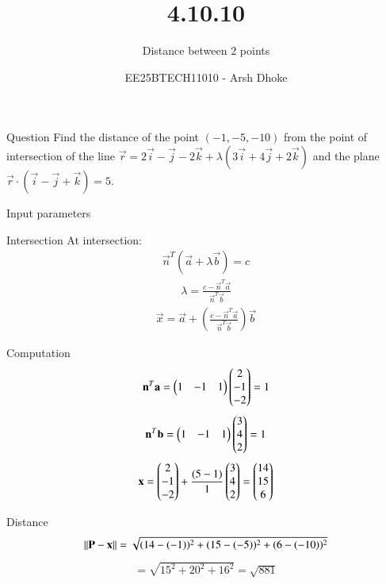 \documentclass{beamer}
\title{4.10.10}
\subtitle{Distance between 2 points}
\author{EE25BTECH11010 - Arsh Dhoke}
\date{}
\begin{document}
\begin{frame}
  \titlepage
\end{frame}

\begin{frame}{Question}
Find the distance of the point $(-1,-5,-10)$ from the point of intersection of the line $\vec{r} = 2\vec{i} - \vec{j} - 2\vec{k} + \lambda (3\vec{i} + 4\vec{j} + 2\vec{k})$ and the plane $\vec{r}\cdot(\vec{i}-\vec{j}+\vec{k}) = 5$.

\end{frame}

\begin{frame}{Input parameters}

\end{frame}

\begin{frame}{Intersection}
At intersection: 
\begin{align}
\vec{n}^T(\vec{a} + \lambda \vec{b}) = c
\end{align}
\begin{align}
\lambda = \frac{c - \vec{n}^T \vec{a}}{\vec{n}^T \vec{b}}
\end{align}
\begin{align}
\vec{x} = \vec{a} + \left(\frac{c-\vec{n}^T\vec{a}}{\vec{n}^T\vec{b}}\right)\vec{b}
\end{align}
\end{frame}

\begin{frame}{Computation}
\begin{align}
\mathbf{n}^T \mathbf{a} = \begin{pmatrix}1 & -1 & 1\end{pmatrix}\begin{pmatrix}2 \\ -1 \\ -2\end{pmatrix} = 1
\end{align}
\begin{align}
\mathbf{n}^T \mathbf{b} = \begin{pmatrix}1 & -1 & 1\end{pmatrix}\begin{pmatrix}3 \\ 4 \\ 2\end{pmatrix} = 1
\end{align}
\begin{align}
\mathbf{x} = \begin{pmatrix}2 \\ -1 \\ -2\end{pmatrix} + \frac{(5-1)}{1}\begin{pmatrix}3 \\ 4 \\ 2\end{pmatrix}
= \begin{pmatrix}14 \\ 15 \\ 6\end{pmatrix}
\end{align}
\end{frame}

\begin{frame}{Distance}
\begin{align}
\left\lVert\mathbf{P}-\mathbf{x}\right\rVert = \sqrt{(14 - (-1))^2 + (15 - (-5))^2 + (6 - (-10))^2}
\end{align}
\begin{align}
= \sqrt{15^2 + 20^2 + 16^2}
= \sqrt{881}
\end{align}
\end{frame}
\end{document}
